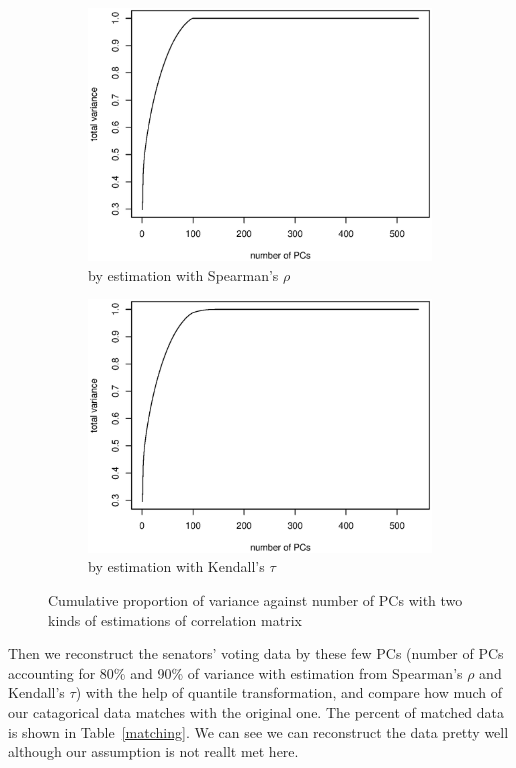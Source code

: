 \documentclass{article}
\theoremstyle{definition}
\begin{document}
	\begin{figure}[!htb]
	    \centering
		\begin{subfigure}[b]{0.45\textwidth}
		\includegraphics[width = \textwidth]{rho.eps}
		\caption{by estimation with Spearman's $\rho$}
		\end{subfigure}%
		\begin{subfigure}[b]{0.45\textwidth}
		\includegraphics[width = \textwidth]{tau.eps}
		\caption{by estimation with Kendall's $\tau$}
		\end{subfigure}
		\caption{Cumulative proportion of variance against number of PCs with two kinds of estimations of correlation matrix}
		\label{cpvar}
	\end{figure}
	 Then we reconstruct the senators' voting data by these few PCs (number of PCs accounting for 80\% and 90\% of variance with estimation from Spearman's $\rho$ and Kendall's $\tau$) with the help of quantile transformation, and compare how much of our catagorical data matches with the original one. The percent of matched data is shown in Table~\ref{matching}. We can see we can reconstruct the data pretty well although our assumption is not reallt met here.
\end{document}
